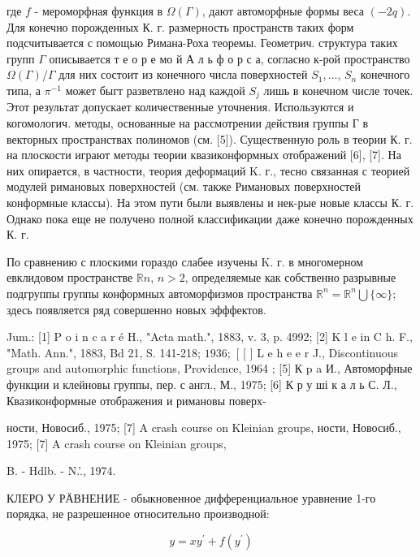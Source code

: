 \documentclass[10pt]{article}
\begin{document}
где $f$ - мероморфная функция в $\Omega(\Gamma)$, дают автоморфные формы веса $(-2 q)$. Для конечно порожденных К. г. размерность пространств таких форм подсчитывается с помощью Римана-Роха теоремы. Геометрич. структура таких групп $\Gamma$ описывается т е о р е мо й А л ь ф о р с а, согласно к-рой пространство $\Omega(\Gamma) / \Gamma$ для них состоит из конечного числа поверхностей $S_{1}, \ldots$, $S_{n}$ конечного типа, а $\pi^{-1}$ может быгт разветвлено над каждой $S_{j}$ лишь в конечном числе точек. Этот результат допускает количественные уточнения. Используются и когомологич. методы, основанные на рассмотрении действия группы $Г$ в векторных пространствах полиномов (см. [5]). Существенную роль в теории К. г. на плоскости играют методы теории квазиконформных отображений [6], [7]. На них опирается, в частности, теория деформаций K. г., тесно связанная с теорией модулей римановых поверхностей (см. также Римановых поверхностей конформные классы). На этом пути были выявлены и нек-рые новые классы К. г. Однако пока еще не получено полной классификации даже конечно порожденных К. г.



По сравнению с плоскими гораздо слабее изучены K. г. в многомерном евклидовом пространстве $\mathbb{R} n$, $n>2$, определяемые как собственно разрывные подгруппы группы конформных автоморфизмов пространства $\mathbb{R}^{n}=\mathbb{R}^{n} \bigcup\{\infty\}$; здесь появляется ряд совершенно новых эфффектов.



Jum.: [1] P o i n c a r é H., "Acta math.", 1883, v. 3, p. 4992; [2] K l e in C h. F., "Math. Ann.", 1883, Bd 21, S. 141-218; $1936 ;$ [ [ ] L e $\mathrm{h}$ e e $\mathrm{r}$ J., Discontinuous groups and automorphic functions, Providence, 1964 ; [5] К p a И., Автоморфные функции и клейновы группы, пер. с англ., М., 1975; [6] К р у ші к а л ь С. Л., Квазиконформные отображения и римановы поверх-

ности, Новосиб., 1975; [7] A crash course on Kleinian groups, ности, Новосиб., 1975; [7] A crash course on Kleinian groups,

B. - Hdlb. - N.'., 1974.



КЛЕРО У РӒВНЕНИЕ - обыкновенное дифференциальное уравнение 1-го порядка, не разрешенное относительно производной:



\[

y=x y^{\prime}+f\left(y^{\prime}\right)

\]
\end{document}
